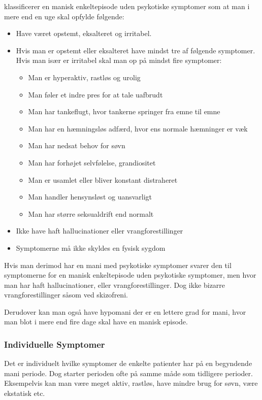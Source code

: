 \citet{misc:netpsykmani} klassificerer en manisk enkeltepisode uden psykotiske symptomer som at man i mere end en uge skal opfylde følgende:
\begin{mdframed}
\begin{itemize}
	\item Have været opstemt, eksalteret og irritabel.
	\item Hvis man er opstemt eller eksalteret have mindst tre af følgende symptomer. Hvis man især er irritabel skal man op på mindst fire symptomer:
	\begin{itemize}
		\item Man er hyperaktiv, rastløs og urolig
		\item Man føler et indre pres for at tale uafbrudt
		\item Man har tankeflugt, hvor tankerne springer fra emne til emne
		\item Man har en hæmningsløs adfærd, hvor ens normale hæmninger er væk
		\item Man har nedsat behov for søvn
		\item Man har forhøjet selvfølelse, grandiositet
		\item Man er usamlet eller bliver konstant distraheret
		\item Man handler hensynsløst og uansvarligt
		\item Man har større seksualdrift end normalt
	\end{itemize}
	\item Ikke have haft hallucinationer eller vrangforestillinger
	\item Symptomerne må ikke skyldes en fysisk sygdom
\end{itemize}
\end{mdframed}
Hvis man derimod har en mani med psykotiske symptomer svarer den til symptomerne for en manisk enkeltepisode uden psykotiske symptomer, men hvor man har haft hallucinationer, eller vrangforestillinger. Dog ikke bizarre vrangforestillinger såsom ved skizofreni.

Derudover kan man også have hypomani der er en lettere grad for mani, hvor man blot i mere end fire dage skal have en manisk episode.

\subsubsection{Individuelle Symptomer}
Det er individuelt hvilke symptomer de enkelte patienter har på en begyndende mani periode.
Dog starter perioden ofte på samme måde som tidligere perioder.
Eksempelvis kan man være meget aktiv, rastløs, have mindre brug for søvn, være ekstatisk etc.

